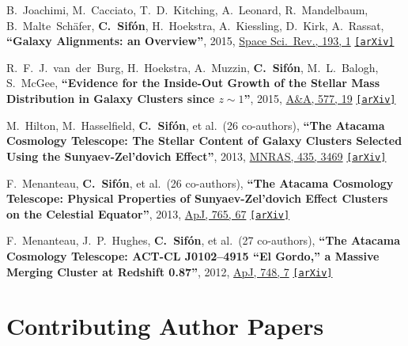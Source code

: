 \documentclass{article}
\def\aap{A\&A}
\def\apj{ApJ}
\def\mnras{MNRAS}
\def\ssr{Space Sci.\ Rev.}
\newcommand{\myself}{\textbf{\color{red} C.~Sif\'on}}
\newcommand{\etal}[1]{et al.\ (#1 co-authors),}
\newcommand{\paper}[1]{\textbf{``#1''}}
\newcommand{\arxiv}[1]
    {\href{https://arxiv.org/abs/#1}{\texttt{\color{magenta}[arXiv]}}}
\begin{document}
\begin{etaremune}
\item
B.~Joachimi, M.~Cacciato, T.~D.~Kitching, A.~Leonard, R.~Mandelbaum, B.~Malte~Sch\"afer, \myself, H.~Hoekstra, A.~Kiessling, D.~Kirk, A.~Rassat,
\paper{Galaxy Alignments: an Overview},
2015, \href{http://adsabs.harvard.edu/doi/10.1007/s11214-015-0177-4}{\ssr, 193, 1}
\arxiv{1504.05456}

\item
R.~F.~J.~van~der~Burg, H.~Hoekstra, A.~Muzzin, \myself, M.~L.~Balogh, S.~McGee,
\paper{Evidence for the Inside-Out Growth of the Stellar Mass Distribution in Galaxy Clusters since $z\sim1$},
2015, \href{http://adsabs.harvard.edu/abs/2015A&A...577A..19V}{\aap, 577, 19}
\arxiv{1412.2137}

\item
M.~Hilton, M.~Hasselfield, \myself, \etal{26}
\paper{The Atacama Cosmology Telescope: The Stellar Content of Galaxy Clusters Selected Using the Sunyaev-Zel'dovich Effect},
2013, \href{https://ui.adsabs.harvard.edu/#abs/2013MNRAS.435.3469H/abstract}{\mnras, 435, 3469}
\arxiv{1301.0780}

\item
F.~Menanteau, \myself, \etal{26}
\paper{The Atacama Cosmology Telescope: Physical Properties of Sunyaev-Zel'dovich Effect Clusters on the Celestial Equator},
2013, \href{https://ui.adsabs.harvard.edu/#abs/2013ApJ...765...67M/abstract}{\apj, 765, 67}
\arxiv{1210.4048}

\item
F.~Menanteau, J.~P.~Hughes, \myself, \etal{27}
\paper{The Atacama Cosmology Telescope: ACT-CL J0102--4915 ``El Gordo,'' a Massive Merging Cluster at Redshift 0.87},
2012, \href{https://ui.adsabs.harvard.edu/#abs/2012ApJ...748....7M/abstract}{\apj, 748, 7}
\arxiv{1109.0953}


\end{etaremune}




\section*{Contributing Author Papers}
\end{document}
